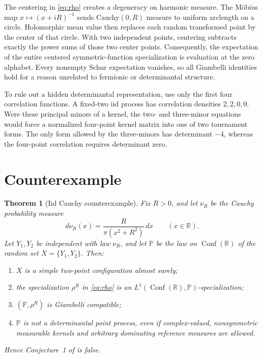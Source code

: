 \documentclass[11pt]{article}
\newtheorem{theorem}{Theorem}
\newcommand{\R}{\mathbb R}
\newcommand{\Pp}{\mathbb P}
\newcommand{\Conf}{\operatorname{Conf}}
\begin{document}
The centering in \eqref{eq:rho} creates a degeneracy on harmonic measure.
The M\"obius map $x\mapsto (x+iR)^{-1}$ sends Cauchy$(0,R)$ measure to
uniform arclength on a circle.  Holomorphic mean value then replaces each
random transformed point by the center of that circle.  With two independent
points, centering subtracts exactly the power sums of those two center points.
Consequently, the expectation of the entire centered symmetric-function
specialization is evaluation at the zero alphabet.  Every nonempty Schur
expectation vanishes, so all Giambelli identities hold for a reason unrelated
to fermionic or determinantal structure.

To rule out a hidden determinantal representation, use only the first four
correlation functions.  A fixed-two iid process has correlation densities
$2,2,0,0$.  Were these principal minors of a kernel, the two- and three-minor
equations would force a normalized four-point kernel matrix into one of two
tournament forms.  The only form allowed by the three-minors has determinant
$-4$, whereas the four-point correlation requires determinant zero.

\section{Counterexample}

\begin{theorem}[Iid Cauchy counterexample]\label{thm:main}
Fix $R>0$, and let $\nu_R$ be the Cauchy probability measure
\begin{equation}\label{eq:cauchy}
 d\nu_R(x)=\frac{R}{\pi(x^2+R^2)}\,dx
 \qquad(x\in\R).
\end{equation}
Let $Y_1,Y_2$ be independent with law $\nu_R$, and let $\Pp$ be the law on
$\Conf(\R)$ of the random set $X=\{Y_1,Y_2\}$.  Then:
\begin{enumerate}
 \item $X$ is a simple two-point configuration almost surely;
 \item the specialization $\rho^R$ in \eqref{eq:rho} is an
 $L^1(\Conf(\R),\Pp)$-specialization;
 \item $(\Pp,\rho^R)$ is Giambelli compatible;
 \item $\Pp$ is not a determinantal point process, even if complex-valued,
 nonsymmetric measurable kernels and arbitrary dominating reference measures
 are allowed.
\end{enumerate}
Hence Conjecture~1 of \cite{source} is false.
\end{theorem}
\end{document}
